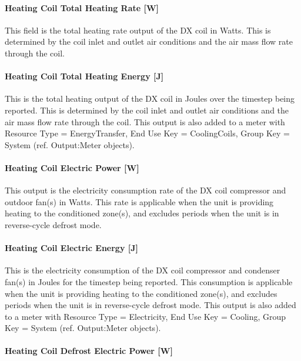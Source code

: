 \paragraph{Heating Coil Total Heating Rate {[}W{]}}\label{heating-coil-total-heating-rate-w-2}

This field is the total heating rate output of the DX coil in Watts. This is determined by the coil inlet and outlet air conditions and the air mass flow rate through the coil.

\paragraph{Heating Coil Total Heating Energy {[}J{]}}\label{heating-coil-total-heating-energy-j-2}

This is the total heating output of the DX coil in Joules over the timestep being reported. This is determined by the coil inlet and outlet air conditions and the air mass flow rate through the coil. This output is also added to a meter with Resource Type = EnergyTransfer, End Use Key = CoolingCoils, Group Key = System (ref. Output:Meter objects).

\paragraph{Heating Coil Electric Power {[}W{]}}\label{heating-coil-electric-power-w-5}

This output is the electricity consumption rate of the DX coil compressor and outdoor fan(s) in Watts. This rate is applicable when the unit is providing heating to the conditioned zone(s), and excludes periods when the unit is in reverse-cycle defrost mode.

\paragraph{Heating Coil Electric Energy {[}J{]}}\label{heating-coil-electric-energy-j-3}

This is the electricity consumption of the DX coil compressor and condenser fan(s) in Joules for the timestep being reported. This consumption is applicable when the unit is providing heating to the conditioned zone(s), and excludes periods when the unit is in reverse-cycle defrost mode. This output is also added to a meter with Resource Type = Electricity, End Use Key = Cooling, Group Key = System (ref. Output:Meter objects).

\paragraph{Heating Coil Defrost Electric Power {[}W{]}}\label{heating-coil-defrost-electric-power-w}

